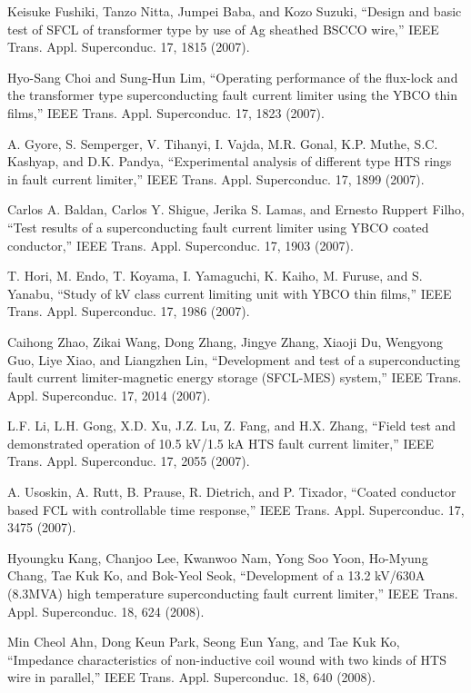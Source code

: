 \noindent [9.140] Keisuke Fushiki, Tanzo Nitta, Jumpei Baba, and Kozo Suzuki, ``Design and basic
test of SFCL of transformer type by use of Ag sheathed BSCCO wire,” IEEE
Trans. Appl. Superconduc. 17, 1815 (2007).

\noindent [9.141] Hyo-Sang Choi and Sung-Hun Lim, ``Operating performance of the flux-lock and
the transformer type superconducting fault current limiter using the YBCO thin
films,” IEEE Trans. Appl. Superconduc. 17, 1823 (2007).

\noindent [9.142] A. Gyore, S. Semperger, V. Tihanyi, I. Vajda, M.R. Gonal, K.P. Muthe, S.C. Kashyap,
and D.K. Pandya, ``Experimental analysis of different type HTS rings in
fault current limiter,” IEEE Trans. Appl. Superconduc. 17, 1899 (2007).

\noindent [9.143] Carlos A. Baldan, Carlos Y. Shigue, Jerika S. Lamas, and Ernesto Ruppert Filho,
``Test results of a superconducting fault current limiter using YBCO coated conductor,”
IEEE Trans. Appl. Superconduc. 17, 1903 (2007).

\noindent [9.144] T. Hori, M. Endo, T. Koyama, I. Yamaguchi, K. Kaiho, M. Furuse, and S. Yanabu,
``Study of kV class current limiting unit with YBCO thin films,” IEEE Trans.
Appl. Superconduc. 17, 1986 (2007).

\noindent [9.145] Caihong Zhao, Zikai Wang, Dong Zhang, Jingye Zhang, Xiaoji Du, Wengyong
Guo, Liye Xiao, and Liangzhen Lin, ``Development and test of a superconducting
fault current limiter-magnetic energy storage (SFCL-MES) system,” IEEE Trans.
Appl. Superconduc. 17, 2014 (2007).

\noindent [9.146] L.F. Li, L.H. Gong, X.D. Xu, J.Z. Lu, Z. Fang, and H.X. Zhang, ``Field test
and demonstrated operation of 10.5 kV/1.5 kA HTS fault current limiter,” IEEE
Trans. Appl. Superconduc. 17, 2055 (2007).

\noindent [9.147] A. Usoskin, A. Rutt, B. Prause, R. Dietrich, and P. Tixador, ``Coated conductor
based FCL with controllable time response,” IEEE Trans. Appl. Superconduc.
17, 3475 (2007).

\noindent [9.148] Hyoungku Kang, Chanjoo Lee, Kwanwoo Nam, Yong Soo Yoon, Ho-Myung
Chang, Tae Kuk Ko, and Bok-Yeol Seok, ``Development of a 13.2 kV/630A
(8.3MVA) high temperature superconducting fault current limiter,” IEEE Trans.
Appl. Superconduc. 18, 624 (2008).

\noindent [9.149] Min Cheol Ahn, Dong Keun Park, Seong Eun Yang, and Tae Kuk Ko, ``Impedance
characteristics of non-inductive coil wound with two kinds of HTS wire in parallel,”
IEEE Trans. Appl. Superconduc. 18, 640 (2008).

